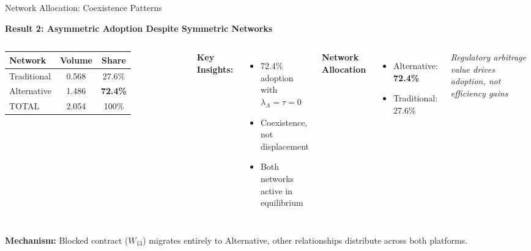 \documentclass[aspectratio=169]{beamer}
\begin{document}
\begin{frame}{Network Allocation: Coexistence Patterns}
    
    \textbf{Result 2: Asymmetric Adoption Despite Symmetric Networks}
    
    \vspace{0.3cm}
    \begin{columns}
        \begin{table}
            \centering
            \small
            \begin{tabular}{lcc}
                \toprule
                \textbf{Network} & \textbf{Volume} & \textbf{Share} \\
                \midrule
                Traditional & 0.568 & 27.6\% \\
                Alternative & 1.486 & \textcolor{SafeGreen}{\textbf{72.4\%}} \\
                \midrule
                TOTAL & 2.054 & 100\% \\
                \bottomrule
            \end{tabular}
        \end{table}
        
        \vspace{0.3cm}
        \textbf{Key Insights:}
        \begin{itemize}
            \item 72.4\% adoption with $\lambda_A = \tau = 0$
            \item Coexistence, not displacement
            \item Both networks active in equilibrium
        \end{itemize}
        
        \centering
        \textbf{Network Allocation}
        
        \vspace{0.5cm}
        \begin{itemize}
            \item Alternative: \textcolor{SafeGreen}{\textbf{72.4\%}}
            \item Traditional: \textcolor{DeepBlue}{27.6\%}
        \end{itemize}
        
        \vspace{0.5cm}
        \small{\textit{Regulatory arbitrage value drives adoption, not efficiency gains}}
    \end{columns}
    
    \vspace{0.3cm}
    \textbf{Mechanism:} Blocked contract ($W_{13}$) migrates entirely to Alternative, other relationships distribute across both platforms.

\end{frame}
\end{document}

